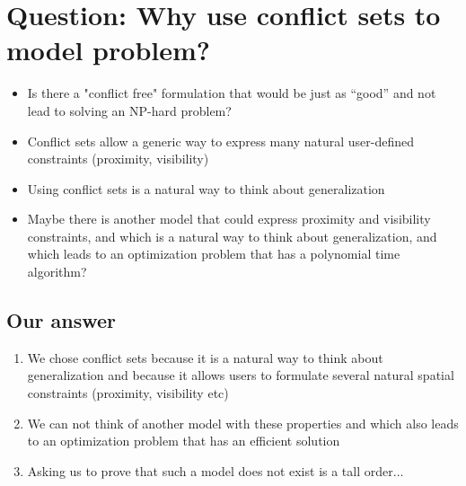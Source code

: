 \documentclass[11pt, oneside]{article}   	%
\begin{document}
\section{Question: Why use conflict sets to model problem?}

\begin{itemize}
\item Is there a "conflict free" formulation that would be just as ``good'' and not lead to solving an NP-hard problem?
\item Conflict sets allow a generic way to express many natural user-defined constraints (proximity, visibility)
\item Using conflict sets is a natural way to think about generalization
\item Maybe there is another model that could express proximity and visibility constraints, and which is a natural way to think about generalization, and which leads to an optimization problem that has a polynomial time algorithm?
\end{itemize}

\subsection{Our answer}

\begin{enumerate}
\item We chose conflict sets because it is a natural way to think about generalization and because it allows users to formulate several natural spatial constraints (proximity, visibility etc)
\item We can not think of another model with these properties and which also leads to an optimization problem that has an efficient solution
\item Asking us to prove that such a model does not exist is a tall order...
\end{enumerate}


\end{document}
